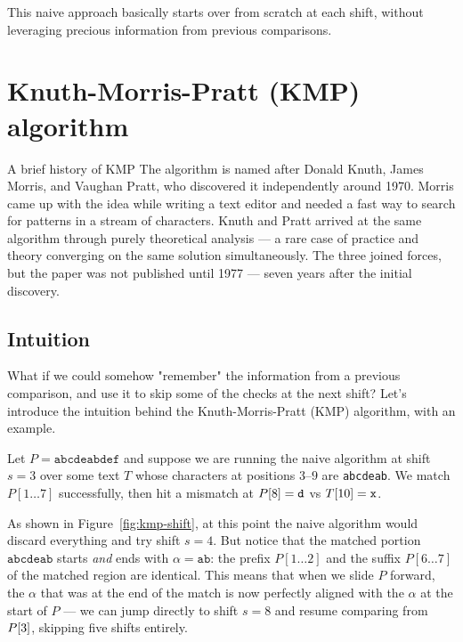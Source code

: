 This naive approach basically starts over from scratch at each shift, without leveraging precious information from previous comparisons.

\section{Knuth-Morris-Pratt (KMP) algorithm}

\begin{intermezzo}{A brief history of KMP}
The algorithm is named after Donald Knuth, James Morris, and Vaughan
Pratt, who discovered it independently around 1970.
Morris came up with the idea while writing a text editor and needed a
fast way to search for patterns in a stream of characters.
Knuth and Pratt arrived at the same algorithm through purely theoretical
analysis --- a rare case of practice and theory converging on the same
solution simultaneously.
The three joined forces, but the paper was not published until 1977 ---
seven years after the initial discovery.
\end{intermezzo}

\subsection{Intuition}

What if we could somehow "remember" the information from a previous comparison, and use it to skip some of the checks at the next shift?
Let's introduce the intuition behind the Knuth-Morris-Pratt (KMP) algorithm, with an example.

\begin{example}
  \label{ex:kmp-intro}
  Let $P = \texttt{abcdeabdef}$ and suppose we are running the naive algorithm at shift $s=3$
  over some text $T$ whose characters at positions $3$--$9$ are \texttt{abcdeab}.
  We match $P[1\ldots7]$ successfully, then hit a mismatch at $P\kern0pt[8] = \texttt{d}$ vs $T\kern0pt[10] = \texttt{x}$.
\end{example}

As shown in Figure~\ref{fig:kmp-shift}, at this point the naive algorithm would discard everything
and try shift $s=4$. But notice that the matched portion $\texttt{abcdeab}$ starts \emph{and} ends
with $\alpha = \texttt{ab}$: the prefix $P[1\ldots2]$ and the suffix $P[6\ldots7]$ of the matched
region are identical. This means that when we slide $P$ forward, the $\alpha$ that was at the end
of the match is now perfectly aligned with the $\alpha$ at the start of $P$ --- we can jump
directly to shift $s=8$ and resume comparing from $P\kern0pt[3]$, skipping five shifts entirely.

